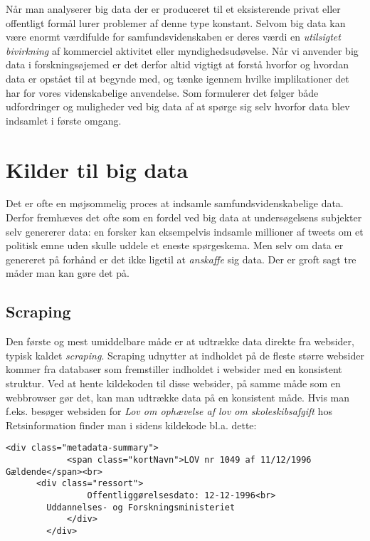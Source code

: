 \documentclass[12pt,]{article}
\begin{document}
Når man analyserer big data der er produceret til et eksisterende privat
eller offentligt formål lurer problemer af denne type konstant. Selvom
big data kan være enormt værdifulde for samfundsvidenskaben er deres
værdi en \emph{utilsigtet bivirkning} af kommerciel aktivitet eller
myndighedsudøvelse. Når vi anvender big data i forskningsøjemed er det
derfor altid vigtigt at forstå hvorfor og hvordan data er opstået til at
begynde med, og tænke igennem hvilke implikationer det har for vores
videnskabelige anvendelse. Som \citet{salganik17} formulerer det følger
både udfordringer og muligheder ved big data af at spørge sig selv
hvorfor data blev indsamlet i første omgang.

\hypertarget{kilder-til-big-data}{%
\section{Kilder til big data}\label{kilder-til-big-data}}

Det er ofte en møjsommelig proces at indsamle samfundsvidenskabelige
data. Derfor fremhæves det ofte som en fordel ved big data at
undersøgelsens subjekter selv genererer data: en forsker kan eksempelvis
indsamle millioner af tweets om et politisk emne uden skulle uddele et
eneste spørgeskema. Men selv om data er genereret på forhånd er det ikke
ligetil at \emph{anskaffe} sig data. Der er groft sagt tre måder man kan
gøre det på.

\hypertarget{scraping}{%
\subsection{Scraping}\label{scraping}}

Den første og mest umiddelbare måde er at udtrække data direkte fra
websider, typisk kaldet \emph{scraping}. Scraping udnytter at indholdet
på de fleste større websider kommer fra databaser som fremstiller
indholdet i websider med en konsistent struktur. Ved at hente kildekoden
til disse websider, på samme måde som en webbrowser gør det, kan man
udtrække data på en konsistent måde. Hvis man f.eks. besøger websiden
for \emph{Lov om ophævelse af lov om skoleskibsafgift} hos
Retsinformation finder man i sidens kildekode bl.a. dette:

\begin{verbatim}
<div class="metadata-summary">
            <span class="kortNavn">LOV nr 1049 af 11/12/1996 Gældende</span><br>
      <div class="ressort">
                Offentliggørelsesdato: 12-12-1996<br>
        Uddannelses- og Forskningsministeriet
            </div>
        </div>
\end{verbatim}
\end{document}
